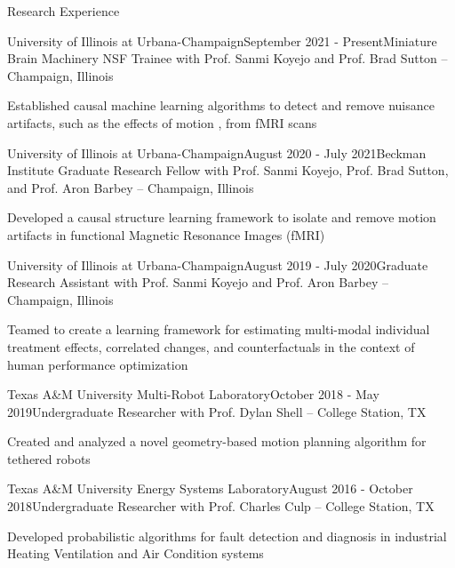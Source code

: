 \documentclass[11pt]{resume} %
\begin{document}
\begin{rSection}{Research Experience}
\begin{rSubsection}{University of Illinois at Urbana-Champaign}{September 2021 - Present}{Miniature Brain Machinery NSF Trainee with Prof. Sanmi Koyejo and Prof. Brad Sutton -- Champaign, Illinois} 

    \setlength\itemsep{0em}
    \item Established causal machine learning algorithms to detect and remove nuisance artifacts, such as the effects of motion , from fMRI scans
\end{rSubsection}
\begin{rSubsection}{University of Illinois at Urbana-Champaign}{August 2020 - July 2021}{Beckman Institute Graduate Research Fellow with Prof. Sanmi Koyejo, Prof. Brad Sutton, and Prof. Aron Barbey -- Champaign, Illinois} 

    \setlength\itemsep{0em}
    \item Developed a causal structure learning framework to isolate and remove motion artifacts in functional Magnetic Resonance Images (fMRI)
\end{rSubsection}
\begin{rSubsection}{University of Illinois at Urbana-Champaign}{August 2019 - July 2020}{Graduate Research Assistant with Prof. Sanmi Koyejo and Prof. Aron Barbey -- Champaign, Illinois} 

    \setlength\itemsep{0em}
    \item Teamed to create a learning framework for estimating multi-modal individual treatment effects, correlated changes, and counterfactuals in the context of human performance optimization
\end{rSubsection}
\begin{rSubsection}{Texas A\&M University Multi-Robot Laboratory}{October 2018 - May 2019}{Undergraduate Researcher with Prof. Dylan Shell -- College Station, TX}

    \setlength\itemsep{0em}
    \item Created and analyzed a novel geometry-based motion planning algorithm for tethered robots
\end{rSubsection}

\begin{rSubsection}{Texas A\&M University Energy Systems Laboratory}{August 2016 - October 2018}{Undergraduate Researcher with Prof. Charles Culp -- College Station, TX}

    \setlength\itemsep{0em}
    \item Developed probabilistic algorithms for fault detection and diagnosis in industrial Heating Ventilation and Air Condition systems
\end{rSubsection}
\end{rSection}
\end{document}
